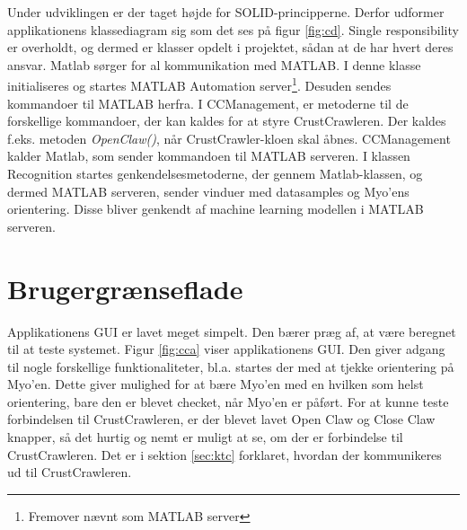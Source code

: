 
Under udviklingen er der taget højde for SOLID-principperne\citep{RefWorks:10}. Derfor udformer applikationens klassediagram sig som det ses på figur \ref{fig:cd}. Single responsibility\citep{RefWorks:9} er overholdt, og dermed er klasser opdelt i projektet, sådan at de har hvert deres ansvar. Matlab sørger for al kommunikation med MATLAB. I denne klasse initialiseres og startes MATLAB Automation server\footnote{Fremover nævnt som MATLAB server}. Desuden sendes kommandoer til MATLAB herfra. I CCManagement, er metoderne til de forskellige kommandoer, der kan kaldes for at styre CrustCrawleren. Der kaldes f.eks. metoden \textit{OpenClaw()}, når CrustCrawler-kloen skal åbnes. CCManagement kalder Matlab, som sender kommandoen til MATLAB serveren. I klassen Recognition startes genkendelsesmetoderne, der gennem Matlab-klassen, og dermed MATLAB serveren, sender vinduer med datasamples og Myo'ens orientering. Disse bliver genkendt af machine learning modellen i MATLAB serveren.

\section{Brugergrænseflade}


Applikationens GUI er lavet meget simpelt. Den bærer præg af, at være beregnet til at teste systemet. Figur \ref{fig:cca} viser applikationens GUI. Den giver adgang til nogle forskellige funktionaliteter, bl.a. startes der med at tjekke orientering på Myo'en. Dette giver mulighed for at bære Myo'en med en hvilken som helst orientering, bare den er blevet checket, når Myo'en er påført. For at kunne teste forbindelsen til CrustCrawleren, er der blevet lavet Open Claw og Close Claw knapper, så det hurtig og nemt er muligt at se, om der er forbindelse til CrustCrawleren. Det er i sektion \ref{sec:ktc} forklaret, hvordan der kommunikeres ud til CrustCrawleren.

